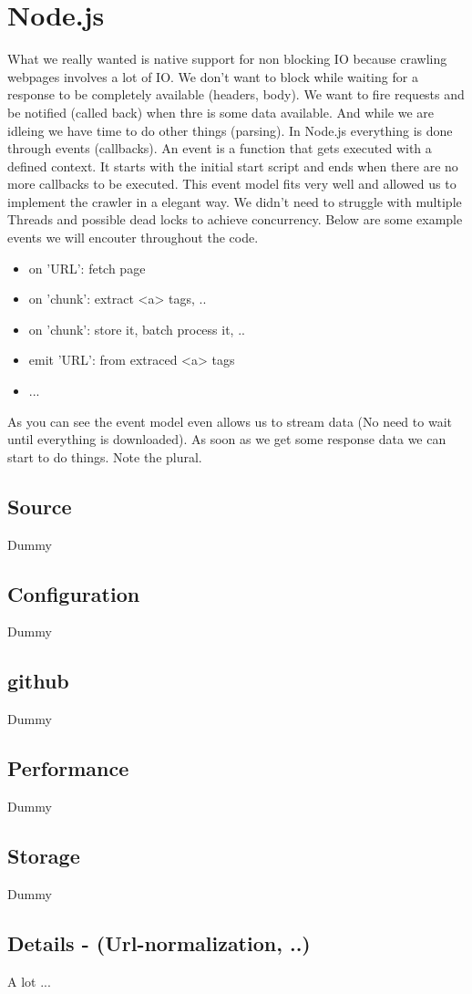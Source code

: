 \section{Node.js}
What we really wanted is native support for non blocking IO because crawling webpages involves a lot of IO. We don't want to block while waiting for a response to be completely available (headers, body). We want to fire requests and be notified (called back) when thre is some data available. And while we are idleing we have time to do other things (parsing). In Node.js everything is done through events (callbacks). An event is a function that gets executed with a defined context. It starts with the initial start script and ends when there are no more callbacks to be executed. This event model fits very well and allowed us to implement the crawler in a elegant way. We didn't need to struggle with multiple Threads and possible dead locks to achieve concurrency. Below are some example events we will encouter throughout the code.

\begin{itemize}
  \item on 'URL': fetch page
  \item on 'chunk': extract <a> tags, ..
  \item on 'chunk': store it, batch process it, ..
  \item emit 'URL': from extraced <a> tags
  \item ...
\end{itemize}

As you can see the event model even allows us to stream data (No need to wait until everything is downloaded). As soon as we get some response data we can start to do things. Note the plural.

\subsection{Source}

Dummy
\subsection{Configuration}
Dummy
\subsection{github}
Dummy
\subsection{Performance}
Dummy
\subsection{Storage}
Dummy
\subsection{Details - (Url-normalization, ..)}
A lot ...

